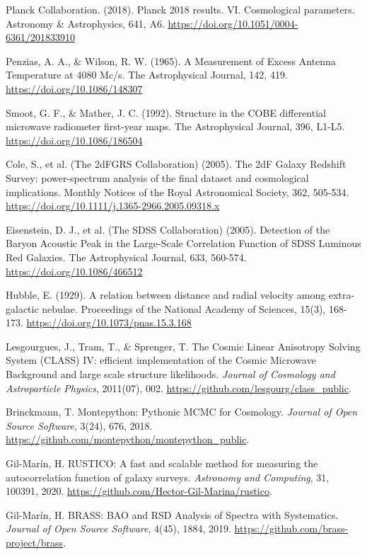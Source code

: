 
\begin{thebibliography}{999}


	 Planck Collaboration. (2018). Planck 2018 results. VI\@. Cosmological parameters. Astronomy \& Astrophysics, 641, A6. \url{https://doi.org/10.1051/0004-6361/201833910}

	 Penzias, A. A., \& Wilson, R. W. (1965). A Measurement of Excess Antenna Temperature at 4080 Mc/s. The Astrophysical Journal, 142, 419. \url{https://doi.org/10.1086/148307}

 Smoot, G. F., \& Mather, J. C. (1992). Structure in the COBE differential microwave radiometer first-year maps. The Astrophysical Journal, 396, L1-L5. \url{https://doi.org/10.1086/186504}

 Cole, S., et al. (The 2dFGRS Collaboration) (2005). The 2dF Galaxy Redshift Survey: power-spectrum analysis of the final dataset and cosmological implications. Monthly Notices of the Royal Astronomical Society, 362, 505-534. \url{https://doi.org/10.1111/j.1365-2966.2005.09318.x}

 Eisenstein, D. J., et al. (The SDSS Collaboration) (2005). Detection of the Baryon Acoustic Peak in the Large-Scale Correlation Function of SDSS Luminous Red Galaxies. The Astrophysical Journal, 633, 560-574. \url{https://doi.org/10.1086/466512}

 Hubble, E. (1929). A relation between distance and radial velocity among extra-galactic nebulae. Proceedings of the National Academy of Sciences, 15(3), 168-173. \url{https://doi.org/10.1073/pnas.15.3.168}

 Lesgourgues, J., Tram, T., \& Sprenger, T. The Cosmic Linear Anisotropy Solving System (CLASS) IV: efficient implementation of the Cosmic Microwave Background and large scale structure likelihoods. \textit{Journal of Cosmology and Astroparticle Physics}, 2011(07), 002. \url{https://github.com/lesgourg/class_public}.

 Brinckmann, T. Montepython: Pythonic MCMC for Cosmology. \textit{Journal of Open Source Software}, 3(24), 676, 2018. \url{https://github.com/montepython/montepython_public}.

 Gil-Marín, H. RUSTICO: A fast and scalable method for measuring the autocorrelation function of galaxy surveys. \textit{Astronomy and Computing}, 31, 100391, 2020. \url{https://github.com/Hector-Gil-Marina/rustico}.

 Gil-Marín, H. BRASS: BAO and RSD Analysis of Spectra with Systematics. \textit{Journal of Open Source Software}, 4(45), 1884, 2019. \url{https://github.com/brass-project/brass}.

\end{thebibliography}
